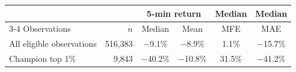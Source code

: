 \begin{tabular}{lrcccc}
\toprule
 & & \multicolumn{2}{c}{5-min return} & Median & Median \\
\cmidrule(lr){3-4}
Observations & $n$ & Median & Mean & MFE & MAE \\
\midrule
All eligible observations & 516{,}383 & $-$9.1\% & $-$8.9\% & 1.1\% & $-$15.7\% \\
Champion top 1\% & 9{,}843 & $-$40.2\% & $-$10.8\% & 31.5\% & $-$41.2\% \\
\bottomrule
\end{tabular}
